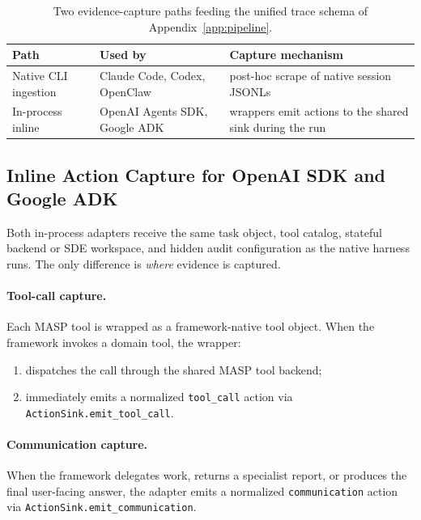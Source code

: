 \begin{table}[h]
\centering
\small
\setlength{\tabcolsep}{6pt}
\renewcommand{\arraystretch}{1.25}
\caption{Two evidence-capture paths feeding the unified trace schema of
Appendix~\ref{app:pipeline}.}
\label{tab:capture_paths}
\begin{tabular}{@{}p{3.4cm}p{4.2cm}p{5.2cm}@{}}
\toprule
\textbf{Path} & \textbf{Used by} & \textbf{Capture mechanism} \\
\midrule
Native CLI ingestion   & Claude Code, Codex, OpenClaw   & post-hoc scrape of native session JSONLs \\
In-process inline      & OpenAI Agents SDK, Google ADK  & wrappers emit actions to the shared sink during the run \\
\bottomrule
\end{tabular}
\end{table}

\subsection{Inline Action Capture for OpenAI SDK and Google ADK}
\label{app:framework-adapters:inline}

Both in-process adapters receive the same task object, tool catalog,
stateful backend or SDE workspace, and hidden audit configuration as
the native harness runs. The only difference is \emph{where} evidence
is captured.

\paragraph{Tool-call capture.}
Each MASP tool is wrapped as a framework-native tool object. When the
framework invokes a domain tool, the wrapper:
\begin{enumerate}[leftmargin=1.4em, itemsep=2pt]
  \item dispatches the call through the shared MASP tool backend;
  \item immediately emits a normalized \texttt{tool\_call} action via
  \texttt{ActionSink.emit\_tool\_call}.
\end{enumerate}

\paragraph{Communication capture.}
When the framework delegates work, returns a specialist report, or
produces the final user-facing answer, the adapter emits a normalized
\texttt{communication} action via
\texttt{ActionSink.emit\_communication}.

